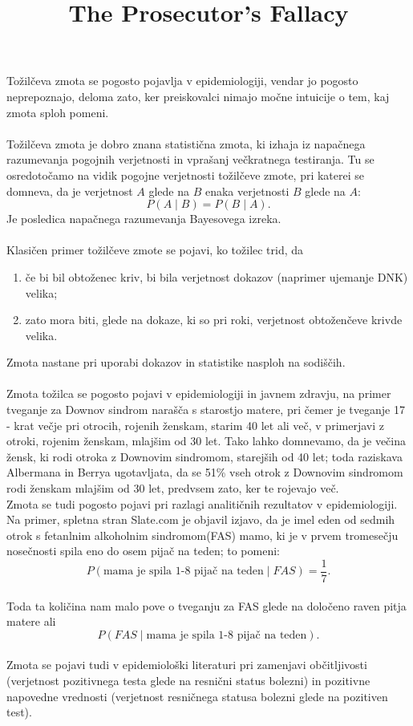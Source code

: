 \documentclass[a4paper,12pt]{article}
\begin{document}
\title{The Prosecutor's Fallacy}
\maketitle

Tožilčeva zmota se pogosto pojavlja v epidemiologiji, vendar jo pogosto neprepoznajo, deloma zato, ker preiskovalci nimajo močne intuicije 
o tem, kaj zmota sploh pomeni. \\
\\
Tožilčeva zmota je dobro znana statistična zmota, ki izhaja iz napačnega razumevanja pogojnih verjetnosti in vprašanj večkratnega testiranja. 
Tu se osredotočamo na vidik pogojne verjetnosti tožilčeve zmote, pri katerei se domneva, da je verjetnost $A$ glede na $B$ enaka verjetnosti 
$B$ glede na $A$:
$$ P(A \mid B) = P(B \mid A). $$
Je posledica napačnega razumevanja Bayesovega izreka. \\
\\
Klasičen primer tožilčeve zmote se pojavi, ko tožilec trid, da
\begin{enumerate}
    \item če bi bil obtoženec kriv, bi bila verjetnost dokazov (naprimer ujemanje DNK) velika;
    \item zato mora biti, glede na dokaze, ki so pri roki, verjetnost obtoženčeve krivde velika.
\end{enumerate}
Zmota nastane pri uporabi dokazov in statistike nasploh na sodiščih.
\\
\\
Zmota tožilca se pogosto pojavi v epidemiologiji in javnem zdravju, na primer tveganje za Downov sindrom narašča s starostjo matere, pri čemer je 
tveganje 17 - krat večje pri otrocih, rojenih ženskam, starim 40 let ali več, v primerjavi z otroki, rojenim ženskam, mlajšim od 30 let. Tako lahko 
domnevamo, da je večina žensk, ki rodi otroka z Downovim sindromom, starejših od 40 let; toda raziskava Albermana in Berrya ugotavljata, da se 51\% vseh 
otrok z Downovim sindromom rodi ženskam mlajšim od 30 let, predvsem zato, ker te rojevajo več. \\
Zmota se tudi pogosto pojavi pri razlagi analitičnih rezultatov v epidemiologiji. Na primer, spletna stran Slate.com je objavil izjavo, da je imel eden od 
sedmih otrok s fetanlnim alkoholnim sindromom(FAS) mamo, ki je v prvem tromesečju nosečnosti spila eno do osem pijač na teden; to pomeni: \\
\[ P(\text{mama je spila 1-8 pijač na teden} \mid FAS) = \frac{1}{7}.\] \\
Toda ta količina nam malo pove o tveganju za FAS glede na določeno raven pitja matere ali \\
\[P(FAS \mid \text{mama je spila 1-8 pijač na teden}).\]
\\
Zmota se pojavi tudi v epidemiološki literaturi pri zamenjavi občitljivosti (verjetnost pozitivnega testa glede na resnični status bolezni) in pozitivne 
napovedne vrednosti (verjetnost resničnega statusa bolezni glede na pozitiven test).
\end{document}
